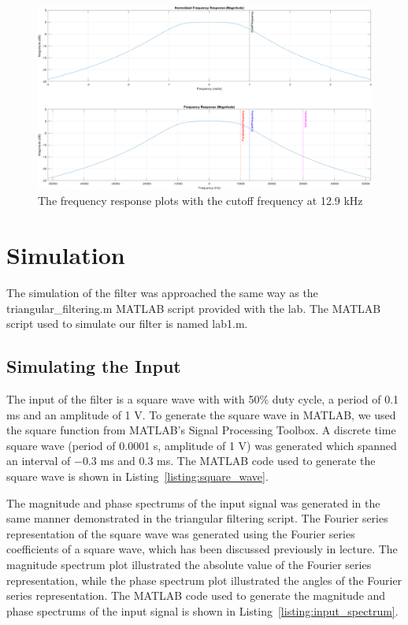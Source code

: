 \documentclass[12pt]{article}
\begin{document}
\begin{figure}[h!]
    \includegraphics[width=\textwidth]{max_frequency_response.png}
    \caption{\label{fig:max_freq_response} The frequency response plots with the cutoff frequency at 12.9 kHz}
\end{figure}


\clearpage
\section*{Simulation}
The simulation of the filter was approached the same way as the triangular\_filtering.m MATLAB script provided with the lab. The MATLAB script used to simulate our filter is named lab1.m.

\subsection*{Simulating the Input}
The input of the filter is a square wave with with 50\% duty cycle, a period of 0.1 ms and an amplitude of 1 V. To generate the square wave in MATLAB, we used the square function from MATLAB's Signal Processing Toolbox. A discrete time square wave (period of 0.0001 s, amplitude of 1 V) was generated which spanned an interval of $-0.3$ ms and $0.3$ ms. The MATLAB code used to generate the square wave is shown in Listing~\ref{listing:square_wave}.


The magnitude and phase spectrums of the input signal was generated in the same manner demonstrated in the triangular filtering script. The Fourier series representation of the square wave was generated using the Fourier series coefficients of a square wave, which has been discussed previously in lecture. The magnitude spectrum plot illustrated the absolute value of the Fourier series representation, while the phase spectrum plot illustrated the angles of the Fourier series representation. The MATLAB code used to generate the magnitude and phase spectrums of the input signal is shown in Listing~\ref{listing:input_spectrum}.

\end{document}
